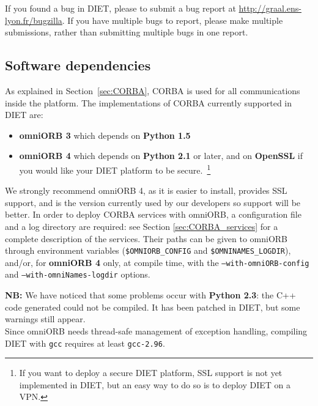 If you found a bug in DIET, please to submit a bug report at
\url{http://graal.ens-lyon.fr/bugzilla}. If you have multiple bugs
to report, please make multiple submissions, rather than submitting
multiple bugs in one report.

\subsection{Software dependencies}

As explained in Section~\ref{sec:CORBA}, CORBA is used for all
communications inside the platform. The implementations of CORBA
currently supported in DIET are:
\begin{itemize}
 \item{\textbf{omniORB 3}} which depends on \textbf{Python 1.5}
 \item{\textbf{omniORB 4}} which depends on \textbf{Python 2.1} or
                           later, and on \textbf{OpenSSL} if you would
                           like your DIET platform to be
                           secure.~\footnote{If you want to deploy a
                           secure DIET platform, SSL support is not
                           yet implemented  in DIET, but an easy way
                           to do so is to deploy DIET on a VPN.}
\end{itemize}
We strongly recommend omniORB 4, as it is easier to install,
provides SSL support, and is the version currently used by our
developers so support will be better. In order to deploy CORBA
services with omniORB, a configuration file and a log directory are
required: see Section
\ref{sec:CORBA_services} for a complete description of the services.
Their paths can be given to omniORB through environment variables
(\texttt{\$OMNIORB\_CONFIG} and \texttt{\$OMNINAMES\_LOGDIR}), and/or,
for \textbf{omniORB 4} only, at compile time, with the
\texttt{--with-omniORB-config} and \texttt{--with-omniNames-logdir}
options.

\noindent 
\textbf{NB:} We have noticed that some problems occur with
\textbf{Python 2.3}: the C++ code generated could not be compiled. It
has been patched in DIET, but some warnings still appear.  \\

Since omniORB needs thread-safe management of exception handling,
compiling DIET with \verb+gcc+ requires at least \verb+gcc-2.96+.  \\

